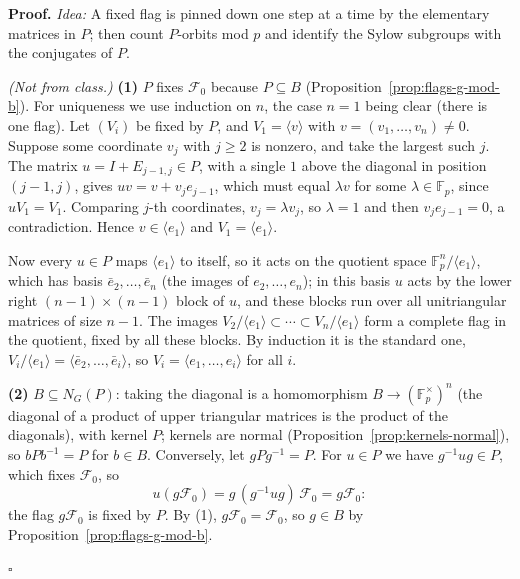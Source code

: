 \documentclass[11pt]{report}
\renewenvironment{proof}[1][Proof]{\noindent\textbf{#1.} }{\hfill$\square$\par\vspace{5pt}}
\begin{document}
\begin{proof}
\textit{Idea:} A fixed flag is pinned down one step at a time by the elementary matrices in $P$; then count $P$-orbits mod $p$ and identify the Sylow subgroups with the conjugates of $P$.\par
\textit{(Not from class.)} \textbf{(1)} $P$ fixes $\mathcal{F}_0$ because $P \subseteq B$ (Proposition~\ref{prop:flags-g-mod-b}). For uniqueness we use induction on $n$, the case $n = 1$ being clear (there is one flag). Let $(V_i)$ be fixed by $P$, and $V_1 = \langle v \rangle$ with $v = (v_1, \ldots, v_n) \neq 0$. Suppose some coordinate $v_j$ with $j \geq 2$ is nonzero, and take the largest such $j$. The matrix $u = I + E_{j-1,j} \in P$, with a single $1$ above the diagonal in position $(j-1, j)$, gives $uv = v + v_j e_{j-1}$, which must equal $\lambda v$ for some $\lambda \in \mathbb{F}_p$, since $uV_1 = V_1$. Comparing $j$-th coordinates, $v_j = \lambda v_j$, so $\lambda = 1$ and then $v_j e_{j-1} = 0$, a contradiction. Hence $v \in \langle e_1 \rangle$ and $V_1 = \langle e_1 \rangle$.

Now every $u \in P$ maps $\langle e_1 \rangle$ to itself, so it acts on the quotient space $\mathbb{F}_p^n / \langle e_1 \rangle$, which has basis $\bar e_2, \ldots, \bar e_n$ (the images of $e_2, \ldots, e_n$); in this basis $u$ acts by the lower right $(n-1) \times (n-1)$ block of $u$, and these blocks run over all unitriangular matrices of size $n - 1$. The images $V_2/\langle e_1 \rangle \subset \cdots \subset V_n/\langle e_1 \rangle$ form a complete flag in the quotient, fixed by all these blocks. By induction it is the standard one, $V_i/\langle e_1 \rangle = \langle \bar e_2, \ldots, \bar e_i \rangle$, so $V_i = \langle e_1, \ldots, e_i \rangle$ for all $i$.

\textbf{(2)} $B \subseteq N_G(P)$: taking the diagonal is a homomorphism $B \to (\mathbb{F}_p^\times)^n$ (the diagonal of a product of upper triangular matrices is the product of the diagonals), with kernel $P$; kernels are normal (Proposition~\ref{prop:kernels-normal}), so $bPb^{-1} = P$ for $b \in B$. Conversely, let $gPg^{-1} = P$. For $u \in P$ we have $g^{-1}ug \in P$, which fixes $\mathcal{F}_0$, so
\[ u(g\mathcal{F}_0) = g\,(g^{-1}ug)\,\mathcal{F}_0 = g\mathcal{F}_0 : \]
the flag $g\mathcal{F}_0$ is fixed by $P$. By (1), $g\mathcal{F}_0 = \mathcal{F}_0$, so $g \in B$ by Proposition~\ref{prop:flags-g-mod-b}.


\end{proof}
\end{document}
